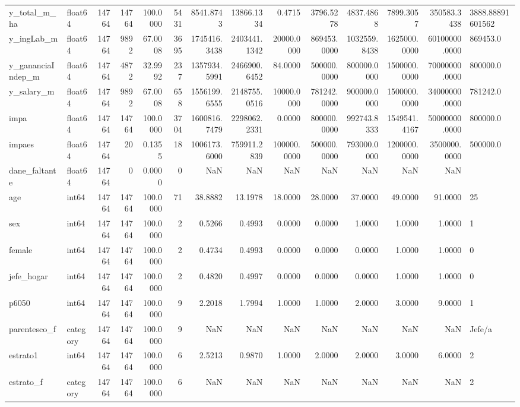 \begin{longtable}{llrrrrrrrrrrrl}
y\_total\_m\_ha & float64 & 14764 & 14764 & 100.0000 & 5431 & 8541.8743 & 13866.1334 & 0.4715 & 3796.5278 & 4837.4868 & 7899.3057 & 350583.3438 & 3888.88891601562 \\
y\_ingLab\_m & float64 & 14764 & 9892 & 67.0008 & 3695 & 1745416.3438 & 2403441.1342 & 20000.0000 & 869453.0000 & 1032559.8438 & 1625000.0000 & 60100000.0000 & 869453.0 \\
y\_gananciaIndep\_m & float64 & 14764 & 4872 & 32.9992 & 237 & 1357934.5991 & 2466900.6452 & 84.0000 & 500000.0000 & 800000.0000 & 1500000.0000 & 70000000.0000 & 800000.0 \\
y\_salary\_m & float64 & 14764 & 9892 & 67.0008 & 658 & 1556199.6555 & 2148755.0516 & 10000.0000 & 781242.0000 & 900000.0000 & 1500000.0000 & 34000000.0000 & 781242.0 \\
impa & float64 & 14764 & 14764 & 100.0000 & 3704 & 1600816.7479 & 2298062.2331 & 0.0000 & 800000.0000 & 992743.8333 & 1549541.4167 & 50000000.0000 & 800000.0 \\
impaes & float64 & 14764 & 20 & 0.1355 & 18 & 1006173.6000 & 759911.2839 & 100000.0000 & 500000.0000 & 793000.0000 & 1200000.0000 & 3500000.0000 & 500000.0 \\
dane\_faltante & float64 & 14764 & 0 & 0.0000 & 0 & NaN & NaN & NaN & NaN & NaN & NaN & NaN &  \\
age & int64 & 14764 & 14764 & 100.0000 & 71 & 38.8882 & 13.1978 & 18.0000 & 28.0000 & 37.0000 & 49.0000 & 91.0000 & 25 \\
sex & int64 & 14764 & 14764 & 100.0000 & 2 & 0.5266 & 0.4993 & 0.0000 & 0.0000 & 1.0000 & 1.0000 & 1.0000 & 1 \\
female & int64 & 14764 & 14764 & 100.0000 & 2 & 0.4734 & 0.4993 & 0.0000 & 0.0000 & 0.0000 & 1.0000 & 1.0000 & 0 \\
jefe\_hogar & int64 & 14764 & 14764 & 100.0000 & 2 & 0.4820 & 0.4997 & 0.0000 & 0.0000 & 0.0000 & 1.0000 & 1.0000 & 0 \\
p6050 & int64 & 14764 & 14764 & 100.0000 & 9 & 2.2018 & 1.7994 & 1.0000 & 1.0000 & 2.0000 & 3.0000 & 9.0000 & 1 \\
parentesco\_f & category & 14764 & 14764 & 100.0000 & 9 & NaN & NaN & NaN & NaN & NaN & NaN & NaN & Jefe/a \\
estrato1 & int64 & 14764 & 14764 & 100.0000 & 6 & 2.5213 & 0.9870 & 1.0000 & 2.0000 & 2.0000 & 3.0000 & 6.0000 & 2 \\
estrato\_f & category & 14764 & 14764 & 100.0000 & 6 & NaN & NaN & NaN & NaN & NaN & NaN & NaN & 2 \\

\end{longtable}
